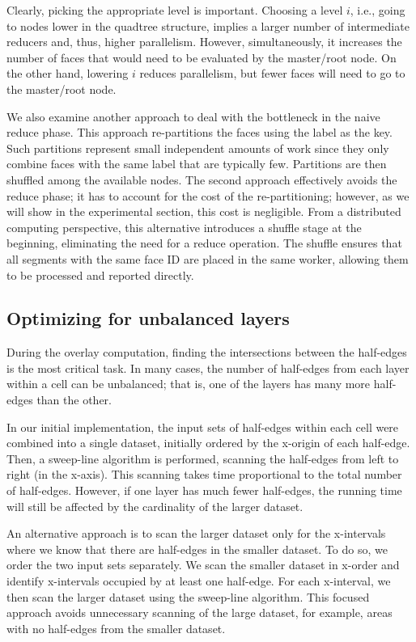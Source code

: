 Clearly, picking the appropriate level is important. Choosing a level $i$, i.e., going to nodes lower in the quadtree structure, implies a larger number of intermediate reducers and, thus, higher parallelism. However, simultaneously, it increases the number of faces that would need to be evaluated by the master/root node. On the other hand, lowering $i$ reduces parallelism, but fewer faces will need to go to the master/root node.

We also examine another approach to deal with the bottleneck in the naive reduce phase. This approach re-partitions the faces using the label as the key. Such partitions represent small independent amounts of work since they only combine faces with the same label that are typically few. Partitions are then shuffled among the available nodes. The second approach effectively avoids the reduce phase; it has to account for the cost of the re-partitioning; however, as we will show in the experimental section, this cost is negligible.  From a distributed computing perspective, this alternative introduces a shuffle stage at the beginning, eliminating the need for a reduce operation. The shuffle ensures that all segments with the same face ID are placed in the same worker, allowing them to be processed and reported directly.

\subsection{Optimizing for unbalanced layers}\label{sec:unbalance}
During the overlay computation, finding the intersections between the half-edges is the most critical task. In many cases, the number of half-edges from each layer within a cell can be unbalanced; that is, one of the layers has many more half-edges than the other.

In our initial implementation, the input sets of half-edges within each cell were combined into a single dataset, initially ordered by the x-origin of each half-edge.  Then, a sweep-line algorithm is performed, scanning the half-edges from left to right (in the x-axis). This scanning takes time proportional to the total number of half-edges. However, if one layer has much fewer half-edges, the running time will still be affected by the cardinality of the larger dataset.

An alternative approach is to scan the larger dataset only for the x-intervals where we know that there are half-edges in the smaller dataset. To do so, we order the two input sets separately. We scan the smaller dataset in x-order and identify x-intervals occupied by at least one half-edge. For each x-interval, we then scan the larger dataset using the sweep-line algorithm. This focused approach avoids unnecessary scanning of the large dataset, for example, areas with no half-edges from the smaller dataset.
